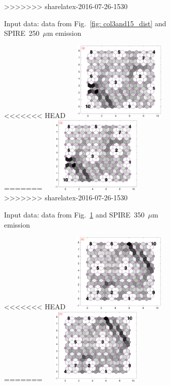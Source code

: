 \begin{figure}
\begin{subfigure}[b]{0.25\textwidth}
>>>>>>> sharelatex-2016-07-26-1530
        \caption{Input data: data from Fig.~\ref{fig: col3and15_dist} and SPIRE~250~$\mu$m emission }
        \label{fig: col3and16_dist}
    \end{subfigure}
        \hfill
    \begin{subfigure}[b]{0.25\textwidth}
        \centering
<<<<<<< HEAD
        \includegraphics[width=54mm, height=38mm]{../../images0.01/M31/2D/diff_dimension/combine_2D_data_between_cols3and17.png}
=======
        \includegraphics[width=54mm, height=37mm]{../../images0.01/M31/2D/diff_dimension/combine_2D_data_between_cols3and17.png}
>>>>>>> sharelatex-2016-07-26-1530
        \caption{Input data: data from Fig.~\ref{fig: col3and16_dist} and SPIRE~350~$\mu$m emission }
        \label{fig: col3and17_dist}
    \end{subfigure}
        \hfill
    \begin{subfigure}[b]{0.25\textwidth}
        \centering
<<<<<<< HEAD
        \includegraphics[width=54mm, height=38mm]{../../images0.01/M31/2D/diff_dimension/combine_2D_data_between_cols3and18.png}
=======
        \includegraphics[width=54mm, height=37mm]{../../images0.01/M31/2D/diff_dimension/combine_2D_data_between_cols3and18.png}

\end{subfigure}
\end{figure}
